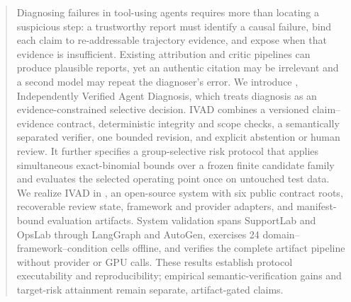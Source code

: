 \begin{abstract}
Diagnosing failures in tool-using agents requires more than locating a suspicious
step: a trustworthy report must identify a causal failure, bind each claim to
re-addressable trajectory evidence, and expose when that evidence is
insufficient. Existing attribution and critic pipelines can produce plausible
reports, yet an authentic citation may be irrelevant and a second model may
repeat the diagnoser's error. We introduce \method, Independently Verified
Agent Diagnosis, which treats diagnosis as an evidence-constrained selective
decision. IVAD combines a versioned claim--evidence contract, deterministic
integrity and scope checks, a semantically separated verifier, one bounded
revision, and explicit abstention or human review. It further specifies a
group-selective risk protocol that applies simultaneous exact-binomial bounds
over a frozen finite candidate family and evaluates the selected operating
point once on untouched test data. We realize IVAD in \system, an open-source
system with six public contract roots, recoverable review state, framework and
provider adapters, and manifest-bound evaluation artifacts. System validation
spans SupportLab and OpsLab through LangGraph and AutoGen, exercises 24
domain--framework--condition cells offline, and verifies the complete artifact
pipeline without provider or GPU calls. These results establish protocol
executability and reproducibility; empirical semantic-verification gains and
target-risk attainment remain separate, artifact-gated claims.
\end{abstract}
